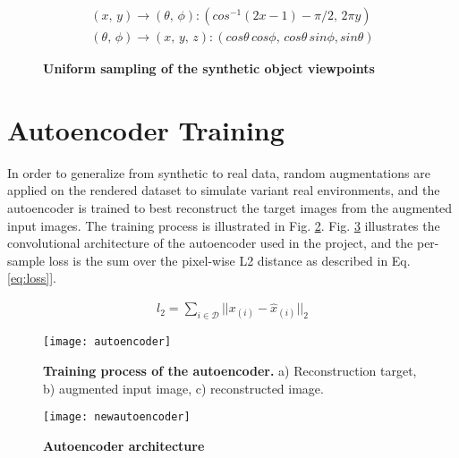 \begin{align}
(x,\,y) \rightarrow (\theta,\, \phi) : (cos^{-1}(2x-1)-\pi /2, \, 2\pi y)
\label{eq:sample1} 
\\
(\theta,\, \phi) \rightarrow (x, \, y, \, z) : (cos \theta \, cos\phi, \, cos\theta \, sin\phi,sin \theta )
\label{eq:sample2} 
\end{align}

\begin{figure}[H]
	\centering
	\qquad 
	\caption[Uniform sampling of the synthetic object viewpoints]{\textbf{Uniform sampling of the synthetic object viewpoints} }
	\label{fig:uniformsample}
\end{figure}


\section{Autoencoder Training}
In order to generalize from synthetic to real data, random augmentations are applied on the rendered dataset to simulate variant real environments, and the autoencoder is trained to best reconstruct the target images from the augmented input images. The training process is illustrated in Fig. \ref{fig:autoencoder}. Fig. \ref{fig:newautoencoder} illustrates the convolutional architecture of the autoencoder used in the project, and the per-sample loss is the sum over the pixel-wise L2 distance as described in Eq. \ref{eq:loss}]. 

\begin{align}
	l_2 = \sum_{i \in \mathcal{D} } || x_{(i)}-\hat{x}_{(i)} || _2
	\label{eq:loss}
\end{align}


\begin{figure}[H]
	\centering
	\texttt{[image: autoencoder]}
	\caption[Training process of the autoencoder]{\textbf{Training process of the autoencoder.} a) Reconstruction target, b) augmented input image, c) reconstructed image.}
	\label{fig:autoencoder}
\end{figure}
\begin{figure}[H]
	\centering
	\texttt{[image: newautoencoder]}
	\caption[Autoencoder architecture]{\textbf{Autoencoder architecture}}
	\label{fig:newautoencoder}
\end{figure}


